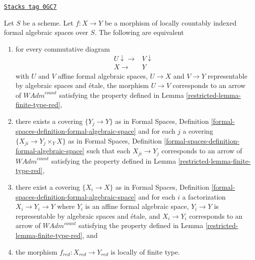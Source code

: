 \begin{lemma}
\label{restricted-lemma-finite-type-red-morphisms}
\href{https://stacks.math.columbia.edu/tag/0GC7}{\texttt{Stacks tag 0GC7}}

Let $S$ be a scheme. Let $f : X \to Y$ be a morphism of
locally countably indexed formal algebraic spaces over $S$.
The following are equivalent
\begin{enumerate}
\item for every commutative diagram
$$
\begin{array}{cc}U \downarrow\longrightarrow & V \downarrow \\ X \longrightarrow & Y\end{array}
$$
with $U$ and $V$ affine formal algebraic spaces, $U \to X$ and $V \to Y$
representable by algebraic spaces and \'etale, the morphism $U \to V$
corresponds to an arrow of $\textit{WAdm}^{count}$ satisfying the
property defined in Lemma \ref{restricted-lemma-finite-type-red},
\item there exists a covering $\{Y_j \to Y\}$ as in
Formal Spaces,
Definition \ref{formal-spaces-definition-formal-algebraic-space}
and for each $j$
a covering $\{X_{ji} \to Y_j \times_Y X\}$ as in
Formal Spaces,
Definition \ref{formal-spaces-definition-formal-algebraic-space}
such that each $X_{ji} \to Y_j$  corresponds
to an arrow of $\textit{WAdm}^{count}$ satisfying the
property defined in Lemma \ref{restricted-lemma-finite-type-red},
\item there exist a covering $\{X_i \to X\}$ as in
Formal Spaces,
Definition \ref{formal-spaces-definition-formal-algebraic-space}
and for each $i$ a factorization $X_i \to Y_i \to Y$ where $Y_i$
is an affine formal algebraic space, $Y_i \to Y$ is representable
by algebraic spaces and \'etale, and $X_i \to Y_i$ corresponds
to an arrow of $\textit{WAdm}^{count}$ satisfying the
property defined in Lemma \ref{restricted-lemma-finite-type-red}, and
\item the morphism $f_{red} : X_{red} \to Y_{red}$ is locally of finite type.
\end{enumerate}
\end{lemma}

